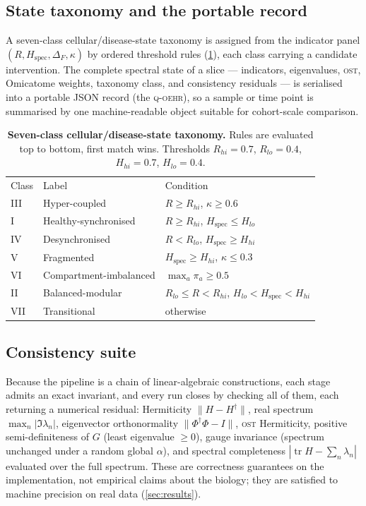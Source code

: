 \documentclass[preprint,12pt,amsmath,amssymb,superscriptaddress,floatfix]{revtex4-2}
\theoremstyle{definition}
\theoremstyle{plain}
\newcommand{\OST}{\textsc{ost}}
\newcommand{\QOEHR}{\textsc{q-oehr}}
\newcommand{\Hspec}{H_{\mathrm{spec}}}
\begin{document}
\subsection{State taxonomy and the portable record}
\label{sec:theory-taxonomy}

A seven-class cellular/disease-state taxonomy is assigned from the indicator
panel $(R,\Hspec,\Delta_F,\kappa)$ by ordered threshold rules
(\cref{tab:taxonomy}), each class carrying a candidate intervention. The complete
spectral state of a slice --- indicators, eigenvalues, \OST, Omicatome weights,
taxonomy class, and consistency residuals --- is serialised into a portable JSON
record (the \QOEHR), so a sample or time point is summarised by one
machine-readable object suitable for cohort-scale comparison.

\begin{table}[htbp]
\centering
\caption{\textbf{Seven-class cellular/disease-state taxonomy.} Rules are
evaluated top to bottom, first match wins. Thresholds
$R_{hi}{=}0.7$, $R_{lo}{=}0.4$, $H_{hi}{=}0.7$, $H_{lo}{=}0.4$.}
\label{tab:taxonomy}
\small
\begin{ruledtabular}
\begin{tabular}{lll}
Class & Label & Condition \\
\colrule
III & Hyper-coupled          & $R\ge R_{hi}$, $\kappa\ge0.6$ \\
I   & Healthy-synchronised   & $R\ge R_{hi}$, $\Hspec\le H_{lo}$ \\
IV  & Desynchronised         & $R<R_{lo}$, $\Hspec\ge H_{hi}$ \\
V   & Fragmented             & $\Hspec\ge H_{hi}$, $\kappa\le0.3$ \\
VI  & Compartment-imbalanced & $\max_a\pi_a\ge0.5$ \\
II  & Balanced-modular       & $R_{lo}\le R<R_{hi}$, $H_{lo}<\Hspec<H_{hi}$ \\
VII & Transitional           & otherwise \\
\end{tabular}
\end{ruledtabular}
\end{table}

\subsection{Consistency suite}
\label{sec:theory-consistency}

Because the pipeline is a chain of linear-algebraic constructions, each stage
admits an exact invariant, and every run closes by checking all of them, each
returning a numerical residual: Hermiticity $\lVert H-H^{\dagger}\rVert$, real
spectrum $\max_n|\Im\lambda_n|$, eigenvector orthonormality
$\lVert\Phi^{\dagger}\Phi-I\rVert$, \OST{} Hermiticity, positive
semi-definiteness of $G$ (least eigenvalue $\ge0$), gauge invariance (spectrum
unchanged under a random global $\alpha$), and spectral completeness
$|\operatorname{tr}H-\sum_n\lambda_n|$ evaluated over the full spectrum. These
are correctness guarantees on the implementation, not empirical claims about the
biology; they are satisfied to machine precision on real data
(\cref{sec:results}).
\end{document}
